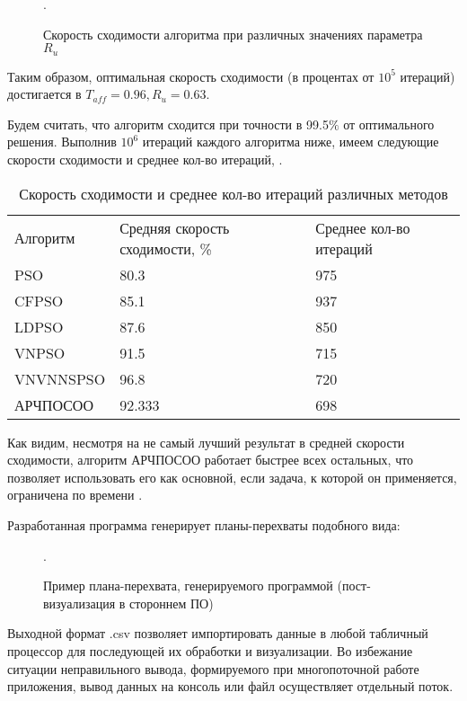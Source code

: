 \begin{figure*}[h!]
	\caption{Скорость сходимости алгоритма при различных значениях параметра $R_{u}$}.
\end{figure*} 

\newpage

Таким образом, оптимальная скорость сходимости (в процентах от $10^5$ итераций) достигается  в $T_{aff} = 0.96, R_{u} = 0.63$.

Будем считать, что алгоритм сходится  при точности в 99.5$\%$ от оптимального решения. Выполнив $10^6$ итераций каждого алгоритма ниже, имеем следующие скорости сходимости и среднее кол-во итераций, \cite[с. 521]{Cheng:2017}.


\begin{table}[]
	\begin{tabular}{lll}
		Алгоритм  & Средняя скорость сходимости, \% & Среднее кол-во итераций \\
		PSO       & 80.3                    & 975                     \\
		CFPSO     & 85.1                    & 937                     \\
		LDPSO     & 87.6                    & 850                     \\
		VNPSO     & 91.5                    & 715                     \\
		VNVNNSPSO & 96.8                    & 720                     \\
		АРЧПОСОО  & 92.333                  & 698                    
	\end{tabular}
	\caption{Скорость сходимости и среднее кол-во итераций различных методов}
	\label{tab:converg_rate_and_avg_iters_number}
\end{table}

Как видим, несмотря на не самый лучший результат в средней скорости сходимости, алгоритм АРЧПОСОО работает быстрее всех остальных, что позволяет использовать его как основной, если задача, к которой он применяется, ограничена по времени \cite[с. 522-524]{Cheng:2017}. 

Разработанная  программа генерирует планы-перехваты подобного вида:



\begin{figure*}[]
	\caption{Пример плана-перехвата, генерируемого программой (пост-визуализация в стороннем ПО)}.
\end{figure*} 

\newpage

Выходной формат .csv позволяет импортировать данные в любой табличный процессор для последующей их обработки и визуализации. Во избежание ситуации неправильного вывода, формируемого при многопоточной работе приложения, вывод данных на консоль или файл осуществляет отдельный поток.

